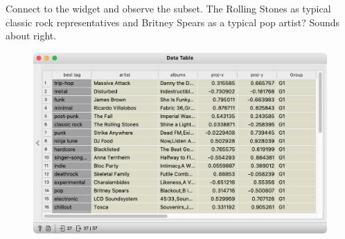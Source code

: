 Connect  to the widget and observe the subset. The Rolling Stones as typical classic rock representatives and Britney Spears as a typical pop artist? Sounds about right.

\vspace{-0.2cm}
\begin{figure}[h]
  \centering
  \includegraphics[width=\linewidth]{data-table.png}%
  \caption{$\;$}
\end{figure}
\vspace{-0.3cm}
